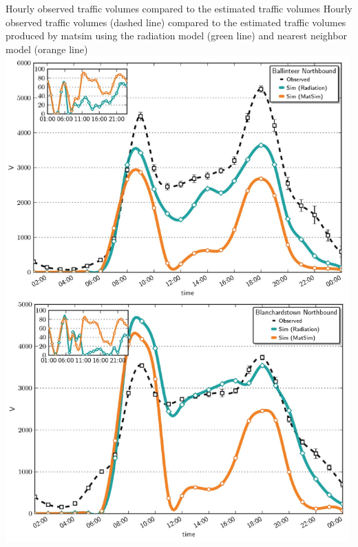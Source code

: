 \createfigure%
{Hourly observed traffic volumes compared to the estimated traffic volumes}%
{Hourly observed traffic volumes (dashed line) compared to the estimated traffic volumes produced by \gls{matsim} using the radiation model (green line) and nearest neighbor model (orange line)}%
{\label{fig:dublin1}}%
{\includegraphics[width=0.99\textwidth, angle=0]{scenarios/figures/dublin1.png}}%
{}






